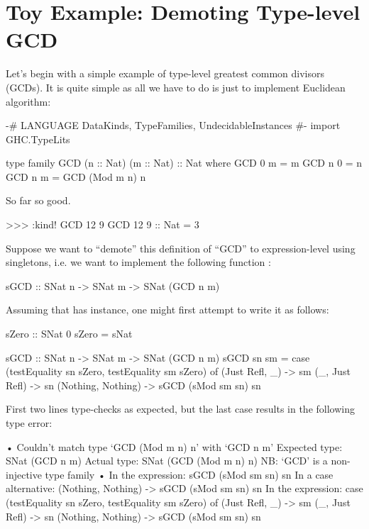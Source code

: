 \documentclass[demotion-paper.tex]{subfiles}
\begin{document}
\section{Toy Example: Demoting Type-level GCD}
Let's begin with a simple example of type-level greatest common divisors (GCDs).
It is quite simple as all we have to do is just to implement Euclidean algorithm:

\begin{code}
{-# LANGUAGE DataKinds, TypeFamilies, UndecidableInstances #-}
import GHC.TypeLits

type family GCD (n :: Nat) (m :: Nat) :: Nat where
  GCD 0 m = m
  GCD n 0 = n
  GCD n m = GCD (Mod m n) n
\end{code}

So far so good.

\begin{repl}
>>> :kind! GCD 12 9
GCD 12 9 :: Nat
= 3
\end{repl}

Suppose we want to ``demote'' this definition of ``GCD'' to expression-level using singletons, i.e. we want to implement the following function :

\begin{code}
sGCD :: SNat n -> SNat m -> SNat (GCD n m)
\end{code}

Assuming that  has  instance, one might first attempt to write it as follows:

\begin{code}
sZero :: SNat 0
sZero = sNat

sGCD :: SNat n -> SNat m -> SNat (GCD n m)
sGCD sn sm = case (testEquality sn sZero, testEquality sm sZero) of
  (Just Refl, _) -> sm
  (_, Just Refl) -> sn
  (Nothing, Nothing) -> sGCD (sMod sm sn) sn
\end{code}

First two lines type-checks as expected, but the last case results in the following type error:

\begin{repl}
• Couldn't match type ‘GCD (Mod m n) n’ with ‘GCD n m’
  Expected type: SNat (GCD n m)
    Actual type: SNat (GCD (Mod m n) n)
  NB: ‘GCD’ is a non-injective type family
• In the expression: sGCD (sMod sm sn) sn
  In a case alternative: (Nothing, Nothing) -> sGCD (sMod sm sn) sn
  In the expression:
    case (testEquality sn sZero, testEquality sm sZero) of
      (Just Refl, _) -> sm
      (_, Just Refl) -> sn
      (Nothing, Nothing) -> sGCD (sMod sm sn) sn
\end{repl}
\end{document}
